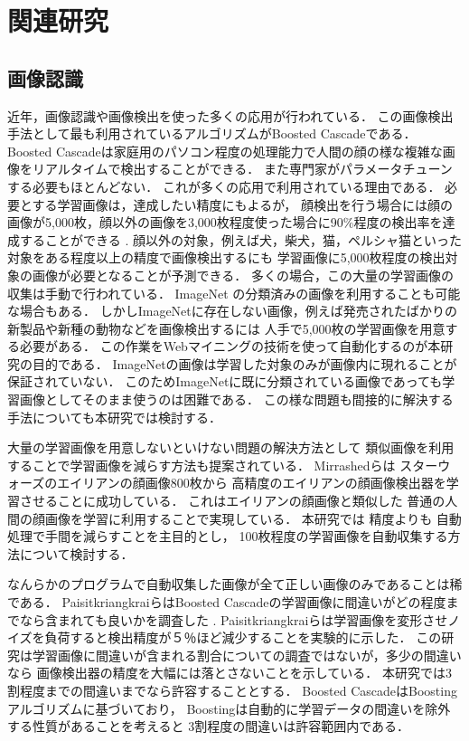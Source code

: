 \chapter{関連研究}
\label{sec:related}

\section{画像認識}

近年，画像認識や画像検出を使った多くの応用が行われている．
この画像検出手法として最も利用されているアルゴリズムがBoosted Cascade\cite{Viola01rapidobject}である．
Boosted Cascadeは家庭用のパソコン程度の処理能力で人間の顔の様な複雑な画像をリアルタイムで検出することができる．
また専門家がパラメータチューンする必要もほとんどない．
これが多くの応用で利用されている理由である．
必要とする学習画像は，達成したい精度にもよるが，
顔検出を行う場合には顔の画像が5,000枚，顔以外の画像を3,000枚程度使った場合に90\%程度の検出率を達成することができる
\cite{Lienhart03empiricalanalysis}
.
顔以外の対象，例えば犬，柴犬，猫，ペルシャ猫といった対象をある程度以上の精度で画像検出するにも
学習画像に5,000枚程度の検出対象の画像が必要となることが予測できる．
多くの場合，この大量の学習画像の収集は手動で行われている．
ImageNet\cite{imagenet}
の分類済みの画像を利用することも可能な場合もある．
しかしImageNetに存在しない画像，例えば発売されたばかりの新製品や新種の動物などを画像検出するには
人手で5,000枚の学習画像を用意する必要がある．
この作業をWebマイニングの技術を使って自動化するのが本研究の目的である．
ImageNetの画像は学習した対象のみが画像内に現れることが保証されていない．
このためImageNetに既に分類されている画像であっても学習画像としてそのまま使うのは困難である．
この様な問題も間接的に解決する手法についても本研究では検討する．

大量の学習画像を用意しないといけない問題の解決方法として
類似画像を利用することで学習画像を減らす方法も提案されている．
Mirrashed\cite{Mirrashed_2013_ICCV}らは
スターウォーズのエイリアンの顔画像800枚から
高精度のエイリアンの顔画像検出器を学習させることに成功している．
これはエイリアンの顔画像と類似した
普通の人間の顔画像を学習に利用することで実現している．
本研究では
精度よりも
自動処理で手間を減らすことを主目的とし，
100枚程度の学習画像を自動収集する方法について検討する．

なんらかのプログラムで自動収集した画像が全て正しい画像のみであることは稀である．
PaisitkriangkraiらはBoosted Cascadeの学習画像に間違いがどの程度までなら含まれても良いかを調査した
\cite{DBLP:journals/corr/abs-1009-5758}
.
Paisitkriangkraiらは学習画像を変形させノイズを負荷すると検出精度が５％ほど減少することを実験的に示した．
この研究は学習画像に間違いが含まれる割合についての調査ではないが，多少の間違いなら
画像検出器の精度を大幅には落とさないことを示している．
本研究では3割程度までの間違いまでなら許容することとする．
Boosted CascadeはBoostingアルゴリズムに基づいており，
Boostingは自動的に学習データの間違いを除外する性質があることを考えると
3割程度の間違いは許容範囲内である．


